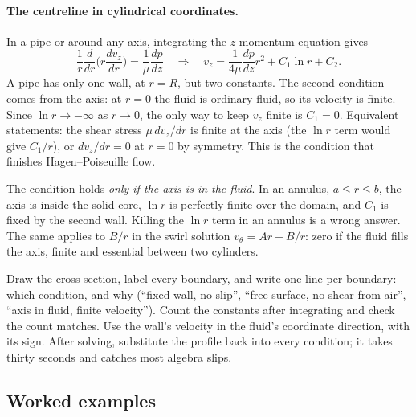 \paragraph{The centreline in cylindrical coordinates.} In a pipe or around any axis, integrating the $z$ momentum equation gives
\[
\frac{1}{r}\frac{d}{dr}\Big(r\frac{dv_z}{dr}\Big) = \frac{1}{\mu}\frac{dp}{dz}
\quad\Longrightarrow\quad
v_z = \frac{1}{4\mu}\frac{dp}{dz}r^2 + C_1\ln r + C_2 .
\]
A pipe has only one wall, at $r = R$, but two constants. The second condition comes from the axis: at $r = 0$ the fluid is ordinary fluid, so its velocity is finite. Since $\ln r \to -\infty$ as $r \to 0$, the only way to keep $v_z$ finite is $C_1 = 0$. Equivalent statements: the shear stress $\mu\,dv_z/dr$ is finite at the axis (the $\ln r$ term would give $C_1/r$), or $dv_z/dr = 0$ at $r = 0$ by symmetry. This is the condition that finishes Hagen--Poiseuille flow.

The condition holds \emph{only if the axis is in the fluid}. In an annulus, $a \le r \le b$, the axis is inside the solid core, $\ln r$ is perfectly finite over the domain, and $C_1$ is fixed by the second wall. Killing the $\ln r$ term in an annulus is a wrong answer. The same applies to $B/r$ in the swirl solution $v_\theta = Ar + B/r$: zero if the fluid fills the axis, finite and essential between two cylinders.

\begin{firstmoves}
Draw the cross-section, label every boundary, and write one line per boundary: which condition, and why (``fixed wall, no slip'', ``free surface, no shear from air'', ``axis in fluid, finite velocity''). Count the constants after integrating and check the count matches. Use the wall's velocity in the fluid's coordinate direction, with its sign. After solving, substitute the profile back into every condition; it takes thirty seconds and catches most algebra slips.
\end{firstmoves}

\subsection*{Worked examples}


